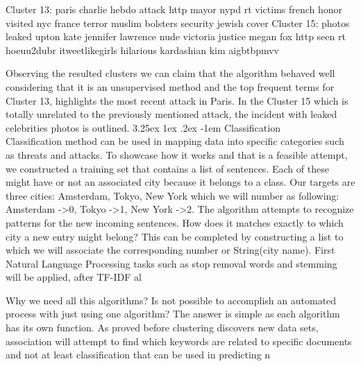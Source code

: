\documentclass[12pt]{article}
\makeatletter
\renewcommand\paragraph{\@startsection{paragraph}{5}{\z@}%
  {3.25ex \@plus1ex \@minus.2ex}%
  {-1em}%
  {\normalfont\normalsize\bfseries}}
\makeatother
\begin{document}
\begin{spverbatim}
Cluster 13:  paris  charlie  hebdo  attack  http  mayor  nypd  
rt  victims  french  honor  visited  nyc  france  terror  muslim 
 bolsters  security  jewish  cover
Cluster 15:  photos  leaked  upton  kate  jennifer  lawrence 
 nude  victoria  justice  megan  fox  http  seen  rt  hoeuu2dubr  
itweetlikegirls  hilarious  kardashian  kim  aigbtbpmvv
\end{spverbatim}
\hfill \break
Observing the resulted clusters we can claim that the algorithm behaved well considering that it is an unsupervised method and the top frequent terms for Cluster 13, highlights the most recent attack in Paris. In the Cluster 15 which is totally unrelated to the previously mentioned attack, the incident with leaked celebrities photos is outlined. 
\paragraph{Classification}
\hfill \break
\\
Classification method can be used in mapping data into specific categories such as threats and attacks. To showcase how it works and that is a feasible attempt, we constructed a training set that contains a list of sentences. Each of these might have or not an associated city because it belongs to a class. Our targets are three cities: Amsterdam, Tokyo, New York which we will number as following: Amsterdam -\textgreater  0, Tokyo -\textgreater 1, New York -\textgreater 2. The algorithm attempts to recognize patterns for the new incoming sentences. How does it matches exactly to which city a new entry might belong? This can be completed by constructing a list to which we will associate the corresponding number or String(city name). First Natural Language Processing tasks such as stop removal words and stemming will be applied, after TF-IDF al    

Why we need all this algorithms? Is not possible to accomplish an automated process with just using one algorithm? The answer is simple as each algorithm has its own function. As proved before clustering discovers new data sets, association will attempt to find which keywords are related to specific documents and not at least classification that can be used in predicting n
\end{document}
